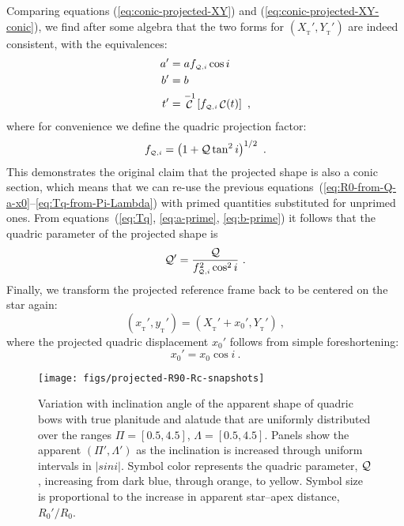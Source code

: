\documentclass[useAMS, usenatbib, a4paper]{mnras}
\DeclareMathOperator{\Cos}{\mathcal{C}}
\providecommand{\abs}[1]{\lvert#1\rvert}
\newcommand\T{_{\mathrm{\scriptscriptstyle T}}} %
\begin{document}
Comparing equations (\ref{eq:conic-projected-XY}) and
(\ref{eq:conic-projected-XY-conic}), we find after some algebra that
the two forms for \((X_{\T}', Y_{\T}')\) are indeed consistent, with
the equivalences:
%
\newcommand\fQi{\ensuremath{f_{\scriptscriptstyle \Q,i}}}
\begin{align}
  \label{eq:a-prime}
  a' &= a \fQi \cos i  \\
  \label{eq:b-prime}
  b' &= b \\
  t' &= \Cos^{-1} \left[ \fQi \Cos(t) \right]  \ ,
\end{align}
where for convenience we define the quadric projection factor:
\begin{equation}
  \label{eq:fQi-factor}
  \fQi = \left( 1 + \Q \tan^2 i \right)^{1/2} \ .
\end{equation}
This demonstrates the original claim that the projected shape is also
a conic section, which means that we can re-use the previous
equations~(\ref{eq:R0-from-Q-a-x0}--\ref{eq:Tq-from-Pi-Lambda}) with
primed quantities substituted for unprimed ones.  From
equations~(\ref{eq:Tq}, \ref{eq:a-prime}, \ref{eq:b-prime}) it follows
that the quadric parameter of the projected shape is
\begin{equation}
  \label{eq:Q-prime}
  \Q' = \frac{ \Q } { \fQi^2 \cos^2 i} \ .
\end{equation}
Finally, we transform the projected reference frame back to be
centered on the star again:
\begin{equation}
  \label{eq:XYZ-xyz-prime}
  (x_{\T}', y_{\T}') = (X_{\T}' + x_0', Y_{\T}') \ , 
\end{equation}
where the projected quadric displacement \(x_0'\) follows from simple
foreshortening:
\begin{equation}
  \label{eq:x0-prime}
  x_0' = x_0 \cos i \ .
\end{equation}


\begin{figure*}
  \centering
  \texttt{[image: figs/projected-R90-Rc-snapshots]}
  \caption[]{Variation with inclination angle of the apparent shape of
    quadric bows with true planitude and alatude that are uniformly
    distributed over the ranges \(\Pi = [0.5, 4.5]\),
    \(\Lambda = [0.5, 4.5]\).  Panels show the apparent
    \((\Pi', \Lambda')\) as the inclination is increased through uniform
    intervals in \(\abs{sin i}\).  Symbol color represents the quadric
    parameter, \(\mathcal{Q}\), increasing from dark blue, through orange, to
    yellow. Symbol size is proportional to the increase in apparent
    star--apex distance, \(R_0'/R_0\).}
  \label{fig:projected-R90-Rc-snapshots}
\end{figure*}
\end{document}
